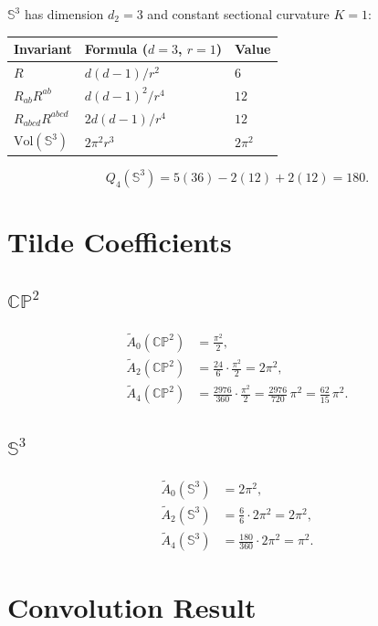 \documentclass[11pt]{article}
\newcommand{\CP}{\mathbb{CP}}
\newcommand{\Sph}{\mathbb{S}}
\newcommand{\Vol}{\mathrm{Vol}}
\begin{document}
$\Sph^3$ has dimension $d_2 = 3$ and constant sectional curvature $K = 1$:
\begin{center}
\begin{tabular}{lll}
\toprule
Invariant & Formula ($d{=}3$, $r{=}1$) & Value \\
\midrule
$R$ & $d(d{-}1)/r^2$ & $6$ \\
$R_{ab}R^{ab}$ & $d(d{-}1)^2/r^4$ & $12$ \\
$R_{abcd}R^{abcd}$ & $2d(d{-}1)/r^4$ & $12$ \\
$\Vol(\Sph^3)$ & $2\pi^2 r^3$ & $2\pi^2$ \\
\bottomrule
\end{tabular}
\end{center}
\begin{equation}
  Q_4(\Sph^3) = 5(36) - 2(12) + 2(12) = 180.
\end{equation}

\section{Tilde Coefficients}

\subsection{$\CP^2$}
\begin{align}
  \widetilde{A}_0(\CP^2) &= \frac{\pi^2}{2}, \\
  \widetilde{A}_2(\CP^2) &= \frac{24}{6} \cdot \frac{\pi^2}{2} = 2\pi^2, \\
  \widetilde{A}_4(\CP^2) &= \frac{2976}{360} \cdot \frac{\pi^2}{2}
  = \frac{2976}{720}\,\pi^2 = \frac{62}{15}\,\pi^2.
\end{align}

\subsection{$\Sph^3$}
\begin{align}
  \widetilde{A}_0(\Sph^3) &= 2\pi^2, \\
  \widetilde{A}_2(\Sph^3) &= \frac{6}{6} \cdot 2\pi^2 = 2\pi^2, \\
  \widetilde{A}_4(\Sph^3) &= \frac{180}{360} \cdot 2\pi^2 = \pi^2.
\end{align}

\section{Convolution Result}
\end{document}
